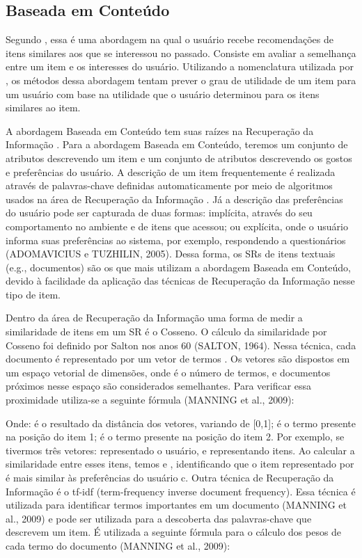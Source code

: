 \subsection{Baseada em Conteúdo}

Segundo , essa é uma abordagem na qual o usuário recebe recomendações de itens
similares aos que se interessou no passado. Consiste em avaliar a semelhança entre um item e os interesses do usuário.
Utilizando a nomenclatura utilizada por , os métodos dessa abordagem tentam prever o
grau de utilidade de um item para um usuário com base na utilidade que o usuário determinou para os itens similares ao item.

A abordagem Baseada em Conteúdo tem suas raízes na Recuperação da Informação \cite{adomavicius2005toward}. Para a
abordagem Baseada em Conteúdo, teremos um conjunto de atributos descrevendo um item e um conjunto de atributos
descrevendo os gostos e preferências do usuário. A descrição de um item frequentemente é realizada através de
palavras-chave definidas automaticamente por meio de algoritmos usados na área de Recuperação da Informação
\cite{adomavicius2005}. Já a descrição das preferências do usuário pode ser capturada de duas formas: implícita,
através do seu comportamento no ambiente e de itens que acessou; ou explícita, onde o usuário informa suas preferências
ao sistema, por exemplo, respondendo a questionários (ADOMAVICIUS e TUZHILIN, 2005). Dessa forma, os SRs de itens
textuais (e.g., documentos) são os que mais utilizam a abordagem Baseada em Conteúdo, devido à facilidade da aplicação
das técnicas de Recuperação da Informação nesse tipo de item.

Dentro da área de Recuperação da Informação uma forma de medir a similaridade de itens em um SR é o Cosseno. O cálculo da similaridade por Cosseno foi definido por Salton nos anos 60 (SALTON, 1964). Nessa técnica, cada documento é representado por um vetor de termos . Os vetores são dispostos em um espaço vetorial de  dimensões, onde  é o número de termos, e documentos próximos nesse espaço são considerados semelhantes. Para verificar essa proximidade utiliza-se a seguinte fórmula (MANNING et al., 2009):

Onde:  é o resultado da distância dos vetores, variando de [0,1];  é o termo presente na posição  do item 1; é o termo presente na posição  do item 2. Por exemplo, se tivermos três vetores:  representado o usuário,  e representando itens. Ao calcular a similaridade entre esses itens, temos  e , identificando que o item representado por  é mais similar às preferências do usuário c.
Outra técnica de Recuperação da Informação é o tf-idf (term-frequency inverse document frequency). Essa técnica é utilizada para identificar termos importantes em um documento (MANNING et al., 2009) e pode ser utilizada para a descoberta das palavras-chave que descrevem um item. É utilizada a seguinte fórmula para o cálculo dos pesos de cada termo do documento (MANNING et al., 2009):

